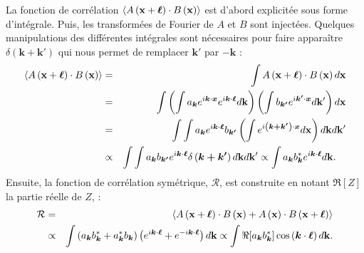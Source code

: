 La fonction de corrélation $\left<A\left({\bf x} + \boldsymbol{\ell}\right)  \cdot B\left({\bf x}\right)\right>$ est d'abord explicitée sous forme d'intégrale. Puis, les transformées de Fourier de $A$ et $B$ sont injectées. Quelques manipulations des différentes intégrales  sont nécessaires pour faire apparaître $\delta\left(\boldsymbol{k+k'}\right)$ qui nous permet de remplacer $\boldsymbol{k'}$ par $-\boldsymbol{k}$ : 
\begin{eqnarray}
\left<A\left({\bf x} + \boldsymbol{\ell}\right)  \cdot B\left({\bf x}\right)\right> &=& \int A\left({\bf x} + \boldsymbol{\ell}\right) \cdot B\left({\bf x}\right) d{\bf x} \\
&=& \int \left(\int a_{\boldsymbol{k}} e^{i\boldsymbol{k}\cdot\boldsymbol{x}} e^{i\boldsymbol{k}\cdot\boldsymbol{\ell}} d{\bf k} \right)\left(\int b_{\boldsymbol{k'}} e^{i\boldsymbol{k'}\cdot\boldsymbol{x}} d{\bf k'}\right) d{\bf x}  \\ 
&=& \int \int a_{\boldsymbol{k}}  e^{i\boldsymbol{k}\cdot\boldsymbol{\ell}}  b_{\boldsymbol{k'}}  \left(\int e^{i\left(\boldsymbol{k+k'}\right)\cdot\boldsymbol{x}}d{\bf x}\right)d{\bf k}d{\bf k'} \\
&\propto& \int \int a_{\boldsymbol{k}} b_{\boldsymbol{k'}} e^{i\boldsymbol{k}\cdot\boldsymbol{\ell}}    \delta\left(\boldsymbol{k+k'}\right) d{\bf k}d{\bf k'}\propto \int a_{\boldsymbol{k}}  b^*_{\boldsymbol{k}} e^{i\boldsymbol{k}\cdot\boldsymbol{\ell}}  d{\bf k} .\quad
\end{eqnarray}
Ensuite, la fonction de corrélation symétrique, $\mathcal{R}$, est construite en notant $\Re[Z]$ la partie réelle de $Z$, : 
\begin{eqnarray}
\mathcal{R} &=& \left<A\left({\bf x} + \boldsymbol{\ell}\right)  \cdot B\left({\bf x}\right) + A\left({\bf x}\right)  \cdot B\left({\bf x} + \boldsymbol{\ell}\right)\right> \\
&\propto& \int \left(a_{\boldsymbol{k}}  b^*_{\boldsymbol{k}} + a^*_{\boldsymbol{k}}  b_{\boldsymbol{k}}\right) \left(e^{i\boldsymbol{k}\cdot\boldsymbol{\ell}} + e^{-i\boldsymbol{k}\cdot\boldsymbol{\ell}}\right)  d{\bf k} \propto \int \Re[a_{\boldsymbol{k}}  b^*_{\boldsymbol{k}}] \cos\left(\boldsymbol{k}\cdot\boldsymbol{\ell}\right) d{\bf k}.
\end{eqnarray}

